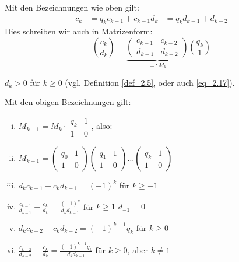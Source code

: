\begin{falko} \label{F2.6}
	Mit den Bezeichnungen wie oben gilt:
	\begin{equation}
	\begin{aligned}
		c_k &= q_k c_{k-1} + c_{k-1}	\label{eq_2.17}
		d_k &= q_k d_{k-1} + d_{k-2}
	\end{aligned}
	\end{equation}
	Dies schreiben wir auch in Matrizenform:
	\begin{equation}
		\binom{c_k}{d_k} = \underbrace{\begin{pmatrix}
		c_{k-1} & c_{k-2} \\ 
		d_{k-1} & d_{k-2}
		\end{pmatrix}}_{=:M_k} \binom{q_k}{1}
	\end{equation}
\end{falko}

	$d_k > 0$ für $k \geq 0$ (vgl. Definition \ref{def_2.5}, oder auch \eqref{eq_2.17}).
	
\begin{falko} \label{F2.7}
	Mit den obigen Bezeichnungen gilt: 
	\begin{enumerate}[(i)]
		\item $M_{k+1} = M_k \cdot \begin{matrix}
			q_k & 1 \\ 1 & 0 
		\end{matrix}$, also:
		\item $M_{k+1} = \begin{pmatrix} q_0 & 1 \\ 1 & 0 \end{pmatrix} \begin{pmatrix} q_1 & 1 \\ 1 & 0 \end{pmatrix} \dots \begin{pmatrix} q_k & 1 \\ 1 & 0 \end{pmatrix}$
		\item $d_kc_{k-1} - c_kd_{k-1} = (-1)^k$ für $k \geq -1$
		\item $\frac{c_{k-1}}{d_{k-1}} - \frac{c_k}{d_k} = \frac{(-1)^k}{d_k d_{k-1}}$ für $k \geq 1$ \hfill $d_{-1} = 0$
		\item $d_kc_{k-2} - c_kd_{k-2} = (-1)^{k-1} q_k$ für $k \geq 0$
		\item $\frac{c_{k-2}}{d_{k-2}} - \frac{c_k}{d_k} = \frac{(-1)^{k-1} q_k}{d_k d_{k-1}}$ für $k \geq 0$, aber $k \neq 1$
	\end{enumerate}
\end{falko}

